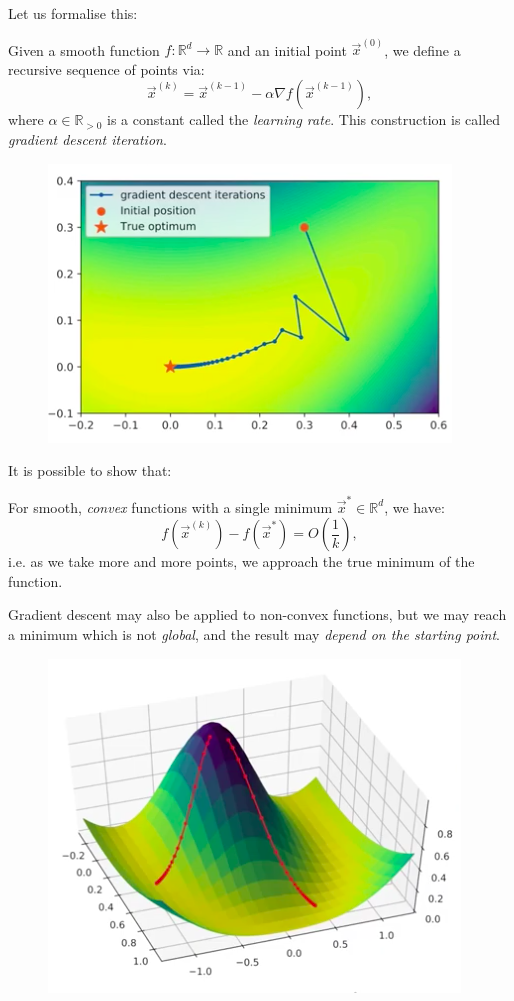 Let us formalise this:
\begin{framedef}
Given a smooth function $f : \mathbb{R}^d \rightarrow \mathbb{R}$ and an initial point $\vec{x}^{(0)}$, we define a recursive sequence of points via:
\begin{equation*}
\vec{x}^{(k)} = \vec{x}^{(k-1)} - \alpha \nabla f(\vec{x}^{(k-1)}),
\end{equation*}
where $\alpha \in \mathbb{R}_{> 0}$ is a constant called the \textit{learning rate}. This construction is called \textit{gradient descent iteration}.

\begin{figure}[H]
\centering
\includegraphics[scale=0.3]{gradientdescent.png}
\end{figure}
\end{framedef}

It is possible to show that:
\begin{frameprop}
For smooth, \textit{convex} functions with a single minimum $\vec{x}^* \in \mathbb{R}^d$, we have:
\begin{equation*}
f(\vec{x}^{(k)}) - f(\vec{x}^*) = O\left( \frac{1}{k} \right),
\end{equation*}
i.e. as we take more and more points, we approach the true minimum of the function.
\end{frameprop}

Gradient descent may also be applied to non-convex functions, but we may reach a minimum which is not \textit{global}, and the result may \textit{depend on the starting point}. 

\begin{figure}[H]
\centering
\includegraphics[scale=0.3]{nonconvex.png}
\end{figure}


